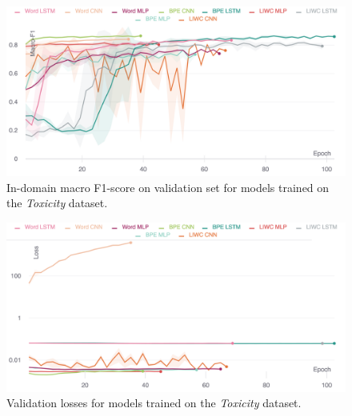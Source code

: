 \begin{figure}
    \centering
    \includegraphics[width=\textwidth]{wulczyn_dev_f1.pdf}
    \caption{In-domain macro F1-score on validation set for models trained on the \textit{Toxicity} dataset.}
    \label{fig:wulczyn_dev_f1}
\end{figure}
\begin{figure}
    \centering
    \includegraphics[width=\textwidth]{wulczyn_dev_loss_stderr_logscale.pdf}
    \caption{Validation losses for models trained on the \textit{Toxicity} dataset.}
    \label{fig:wulczyn_dev_loss}
\end{figure}

